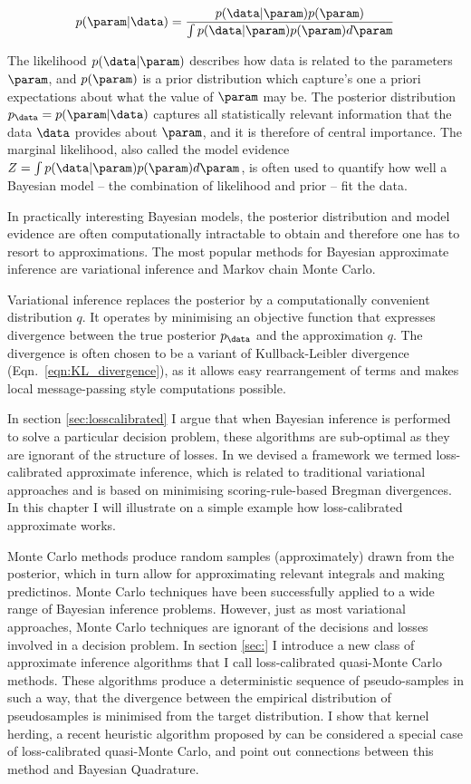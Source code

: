 \begin{equation}
	p(\param\vert\data) = \frac{p(\data\vert\param) p(\param)}{\int p(\data\vert\param) p(\param) d\param}
\end{equation}

The likelihood $p(\data\vert\param)$ describes how data is related to the parameters $\param$, and $p(\param)$ is a prior distribution which capture's one a priori expectations about what the value of $\param$ may be. The posterior distribution $p_\data = p(\param\vert\data)$ captures all statistically relevant information that the data $\data$ provides about $\param$, and it is therefore of central importance. The marginal likelihood, also called the model evidence $Z = \int p(\data\vert\param) p(\param) d\param$, is often used to quantify how well a Bayesian model -- the combination of likelihood and prior -- fit the data.

In practically interesting Bayesian models, the posterior distribution and model evidence are often computationally intractable to obtain and therefore one has to resort to approximations. The most popular methods for Bayesian approximate inference are variational inference and Markov chain Monte Carlo.

Variational inference replaces the posterior by a computationally convenient distribution $q$. It operates by minimising an objective function that expresses divergence between the true posterior $p_\data$ and the approximation $q$. The divergence is often chosen to be a variant of Kullback-Leibler divergence (Eqn.\ \eqref{eqn:KL_divergence}), as it allows easy rearrangement of terms and makes local message-passing style computations possible.

In section \ref{sec:losscalibrated} I argue that when Bayesian inference is performed to solve a particular decision problem, these algorithms are sub-optimal as they are ignorant of the structure of losses. In \citep{Lacoste2011} we devised a framework we termed loss-calibrated approximate inference, which is related to traditional variational approaches and is based on minimising scoring-rule-based Bregman divergences. In this chapter I will illustrate on a simple example how loss-calibrated approximate works.

Monte Carlo methods produce random samples (approximately) drawn from the posterior, which in turn allow for approximating relevant integrals and making predictinos. Monte Carlo techniques have been successfully applied to a wide range of Bayesian inference problems. However, just as most variational approaches, Monte Carlo techniques are ignorant of the decisions and losses involved in a decision problem. In section \ref{sec:} I introduce a new class of approximate inference algorithms that I call loss-calibrated quasi-Monte Carlo methods. These algorithms produce a deterministic sequence of pseudo-samples in such a way, that the divergence between the empirical distribution of pseudosamples is minimised from the target distribution. I show that kernel herding, a recent heuristic algorithm proposed by \citet{Chen2012} can be considered a special case of loss-calibrated quasi-Monte Carlo, and point out connections between this method and Bayesian Quadrature.

